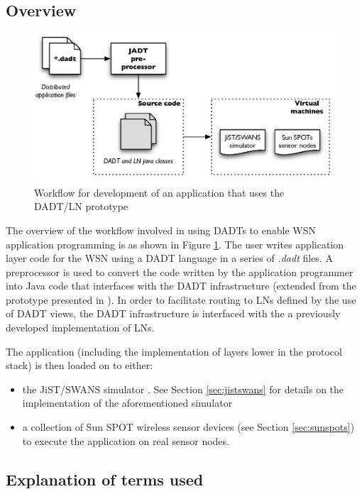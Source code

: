 \subsection{Overview}
\begin{figure}
\centering
\label{Fig:DADTLN_architecture}
\includegraphics[width=\textwidth]{img/DADTLN_architecture.eps} 
\caption[DADT/LN application workflow]{Workflow for development of an application that uses
the DADT/LN prototype}
\end{figure} 
The overview of the workflow involved in using DADTs to enable WSN application
programming is as shown in Figure \ref{Fig:DADTLN_architecture}. The user writes
application layer code for the WSN using a DADT language in a series of
\emph{.dadt} files. A preprocessor is used to convert the code written by the
application programmer into Java code that interfaces with the DADT
infrastructure (extended from the prototype presented in
\cite{migliavacca_DADT:2006}). In order to facilitate routing to LNs defined by
the use of DADT views, the DADT infrastructure is interfaced with the a
previously developed implementation of LNs. 

The application (including the implementation of layers lower in the protocol
stack) is then loaded on to either:
\begin{itemize}
\item the JiST/SWANS simulator \cite{barr_JIST:2005, barr_SWANS}. See Section \ref{sec:jistswans} for details on the implementation of
the aforementioned simulator
\item a collection of Sun SPOT wireless sensor devices \cite{simon_squawk:2006}
(see Section \ref{sec:sunspots}) to execute the application on real sensor nodes.
\end{itemize}

\subsection{Explanation of terms used}

